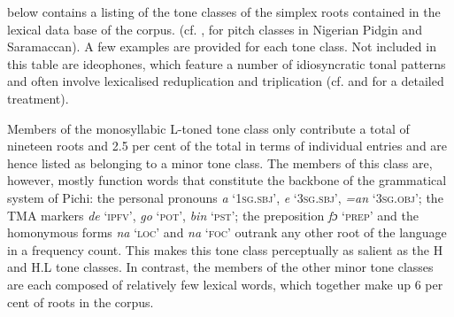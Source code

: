  below contains a listing of the tone classes of the simplex roots contained in the lexical data base of the corpus. (cf. \citealt{Faraclas1996,Good2004}, for pitch classes in Nigerian Pidgin and Saramaccan). A few examples are provided for each tone class. Not included in this table are ideophones, which feature a number of idiosyncratic tonal patterns and often involve lexicalised reduplication and triplication (cf.  and  for a detailed treatment).

Members of the monosyllabic L-toned tone class only contribute a total of nineteen roots and 2.5 per cent of the total in terms of individual entries and are hence listed as belonging to a minor tone class. The members of this class are, however, mostly function words that constitute the backbone of the grammatical system of Pichi: the personal pronouns \textit{a} ‘\textsc{1sg.sbj}’, \textit{e} ‘\textsc{3sg.sbj}’, \textit{=an} ‘\textsc{3sg.obj}’; the \textsc{TMA} markers \textit{de} ‘\textsc{ipfv}’, \textit{go} ‘\textsc{pot}’, \textit{bin} ‘\textsc{pst}’; the preposition \textit{fɔ} ‘\textsc{prep}’ and the homonymous forms \textit{na} ‘\textsc{loc}’ and \textit{na} ‘\textsc{foc}’ outrank any other root of the language in a frequency count. This makes this tone class perceptually as salient as the H and H.L tone classes. In contrast, the members of the other minor tone classes are each  composed of relatively few lexical words, which together make up 6 per cent of roots in the corpus. 


